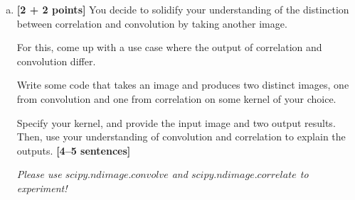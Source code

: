 \documentclass[11pt]{article}
\begin{document}
\begin{enumerate}[(a)]

    \pagebreak
    \item \textbf{[2 + 2 points]}
    You decide to solidify your understanding of the distinction between correlation and convolution by taking another image.
    
    \begin{tcolorbox}[colback=orange!5!white,colframe=orange!75!black]
    For this, come up with a use case where the output of correlation and convolution differ.
    
    Write some code that takes an image and produces two distinct images, one from convolution and one from correlation on some kernel of your choice. 
    
    Specify your kernel, and provide the input image and two output results. Then, use your understanding of convolution and correlation to explain the outputs. \textbf{[4--5 sentences]}
    \end{tcolorbox}
    
    \emph{Please use \href{https://docs.scipy.org/doc/scipy/reference/generated/scipy.ndimage.convolve.html}{$scipy.ndimage.convolve$} and \href{https://docs.scipy.org/doc/scipy/reference/generated/scipy.ndimage.correlate.html}{$scipy.ndimage.correlate$} to experiment!}
    


\end{enumerate}
\end{document}

